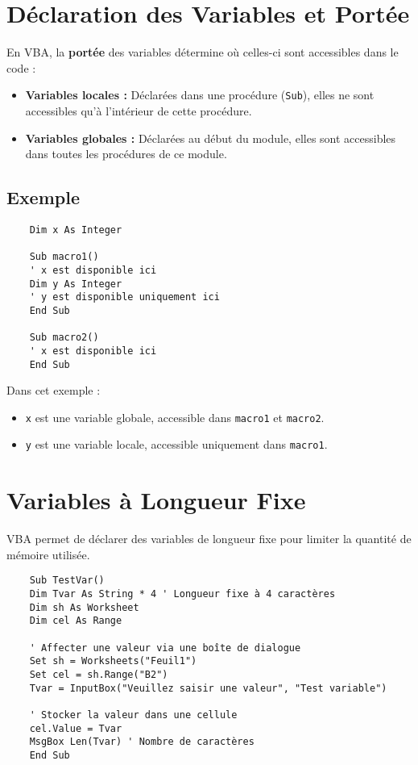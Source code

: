 \documentclass[a4paper,12pt]{report}
\begin{document}
\section{Déclaration des Variables et Portée}
En VBA, la \textbf{portée} des variables détermine où celles-ci sont accessibles dans le code :
\begin{itemize}
	\item \textbf{Variables locales :} Déclarées dans une procédure (\texttt{Sub}), elles ne sont accessibles qu'à l'intérieur de cette procédure.
	\item \textbf{Variables globales :} Déclarées au début du module, elles sont accessibles dans toutes les procédures de ce module.
\end{itemize}

\subsection*{Exemple}
\begin{lstlisting}
	Dim x As Integer
	
	Sub macro1()
	' x est disponible ici
	Dim y As Integer
	' y est disponible uniquement ici
	End Sub
	
	Sub macro2()
	' x est disponible ici
	End Sub
\end{lstlisting}

Dans cet exemple :
\begin{itemize}
	\item \texttt{x} est une variable globale, accessible dans \texttt{macro1} et \texttt{macro2}.
	\item \texttt{y} est une variable locale, accessible uniquement dans \texttt{macro1}.
\end{itemize}

\section{Variables à Longueur Fixe}
VBA permet de déclarer des variables de longueur fixe pour limiter la quantité de mémoire utilisée.
\begin{lstlisting}
	Sub TestVar()
	Dim Tvar As String * 4 ' Longueur fixe à 4 caractères
	Dim sh As Worksheet
	Dim cel As Range
	
	' Affecter une valeur via une boîte de dialogue
	Set sh = Worksheets("Feuil1")
	Set cel = sh.Range("B2")
	Tvar = InputBox("Veuillez saisir une valeur", "Test variable")
	
	' Stocker la valeur dans une cellule
	cel.Value = Tvar
	MsgBox Len(Tvar) ' Nombre de caractères
	End Sub
\end{lstlisting}
\end{document}
